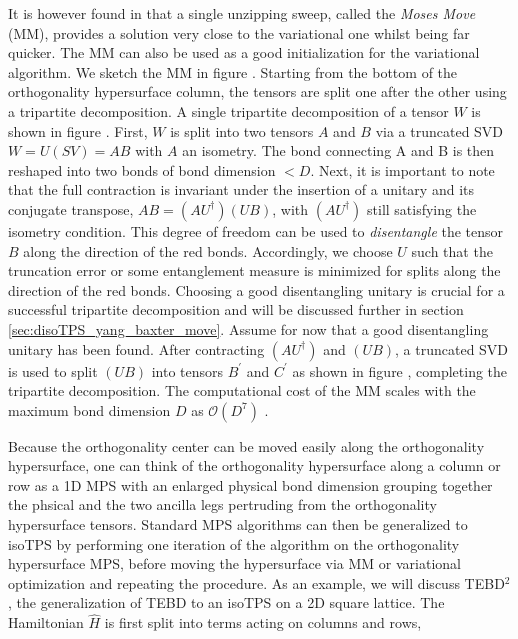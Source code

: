 It is however found in \cite{cite:isometric_tensor_network_states_in_two_dimensions} that a single unzipping sweep, called the \textit{Moses Move} (MM), provides a solution very close to the variational one whilst being far quicker. The MM can also be used as a good initialization for the variational algorithm. We sketch the MM in figure . Starting from the bottom of the orthogonality hypersurface column, the tensors are split one after the other using a tripartite decomposition. A single tripartite decomposition of a tensor $W$ is shown in figure . First, $W$ is split into two tensors $A$ and $B$ via a truncated SVD $W = U(SV) = AB$ with $A$ an isometry. The bond connecting A and B is then reshaped into two bonds of bond dimension $<D$. Next, it is important to note that the full contraction is invariant under the insertion of a unitary and its conjugate transpose, $AB = (AU^\dagger)(UB)$, with $(AU^\dagger)$ still satisfying the isometry condition. This degree of freedom can be used to \textit{disentangle} the tensor $B$ along the direction of the red bonds. Accordingly, we choose $U$ such that the truncation error or some entanglement measure is minimized for splits along the direction of the red bonds. Choosing a good disentangling unitary is crucial for a successful tripartite decomposition and will be discussed further in section \ref{sec:disoTPS_yang_baxter_move}. Assume for now that a good disentangling unitary has been found. After contracting $(AU^\dagger)$ and $(UB)$, a truncated SVD is used to split $(UB)$ into tensors $B^\prime$ and $C^\prime$ as shown in figure , completing the tripartite decomposition. The computational cost of the MM scales with the maximum bond dimension $D$ as $\mathcal{O}(D^7)$ \cite{cite:isometric_tensor_network_states_in_two_dimensions, cite:efficient_simulation_of_dynamics_in_two_dimensional_quantum_spin_systems}.\par
Because the orthogonality center can be moved easily along the orthogonality hypersurface, one can think of the orthogonality hypersurface along a column or row as a 1D MPS with an enlarged physical bond dimension grouping together the phsical and the two ancilla legs pertruding from the orthogonality hypersurface tensors. Standard MPS algorithms can then be generalized to isoTPS by performing one iteration of the algorithm on the orthogonality hypersurface MPS, before moving the hypersurface via MM or variational optimization and repeating the procedure. As an example, we will discuss TEBD$^2$, the generalization of TEBD to an isoTPS on a 2D square lattice. The Hamiltonian $\hat{H}$ is first split into terms acting on columns and rows,
